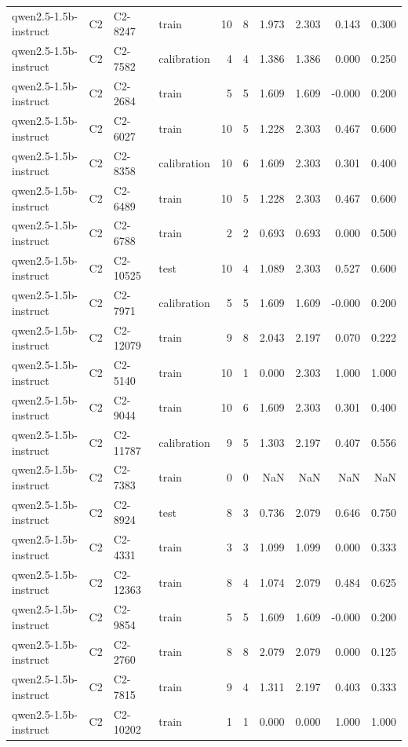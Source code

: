 \begin{table}
\begin{tabular}{llllrrrrrr}
qwen2.5-1.5b-instruct & C2 & C2-8247 & train & 10 & 8 & 1.973 & 2.303 & 0.143 & 0.300 \\
qwen2.5-1.5b-instruct & C2 & C2-7582 & calibration & 4 & 4 & 1.386 & 1.386 & 0.000 & 0.250 \\
qwen2.5-1.5b-instruct & C2 & C2-2684 & train & 5 & 5 & 1.609 & 1.609 & -0.000 & 0.200 \\
qwen2.5-1.5b-instruct & C2 & C2-6027 & train & 10 & 5 & 1.228 & 2.303 & 0.467 & 0.600 \\
qwen2.5-1.5b-instruct & C2 & C2-8358 & calibration & 10 & 6 & 1.609 & 2.303 & 0.301 & 0.400 \\
qwen2.5-1.5b-instruct & C2 & C2-6489 & train & 10 & 5 & 1.228 & 2.303 & 0.467 & 0.600 \\
qwen2.5-1.5b-instruct & C2 & C2-6788 & train & 2 & 2 & 0.693 & 0.693 & 0.000 & 0.500 \\
qwen2.5-1.5b-instruct & C2 & C2-10525 & test & 10 & 4 & 1.089 & 2.303 & 0.527 & 0.600 \\
qwen2.5-1.5b-instruct & C2 & C2-7971 & calibration & 5 & 5 & 1.609 & 1.609 & -0.000 & 0.200 \\
qwen2.5-1.5b-instruct & C2 & C2-12079 & train & 9 & 8 & 2.043 & 2.197 & 0.070 & 0.222 \\
qwen2.5-1.5b-instruct & C2 & C2-5140 & train & 10 & 1 & 0.000 & 2.303 & 1.000 & 1.000 \\
qwen2.5-1.5b-instruct & C2 & C2-9044 & train & 10 & 6 & 1.609 & 2.303 & 0.301 & 0.400 \\
qwen2.5-1.5b-instruct & C2 & C2-11787 & calibration & 9 & 5 & 1.303 & 2.197 & 0.407 & 0.556 \\
qwen2.5-1.5b-instruct & C2 & C2-7383 & train & 0 & 0 & NaN & NaN & NaN & NaN \\
qwen2.5-1.5b-instruct & C2 & C2-8924 & test & 8 & 3 & 0.736 & 2.079 & 0.646 & 0.750 \\
qwen2.5-1.5b-instruct & C2 & C2-4331 & train & 3 & 3 & 1.099 & 1.099 & 0.000 & 0.333 \\
qwen2.5-1.5b-instruct & C2 & C2-12363 & train & 8 & 4 & 1.074 & 2.079 & 0.484 & 0.625 \\
qwen2.5-1.5b-instruct & C2 & C2-9854 & train & 5 & 5 & 1.609 & 1.609 & -0.000 & 0.200 \\
qwen2.5-1.5b-instruct & C2 & C2-2760 & train & 8 & 8 & 2.079 & 2.079 & 0.000 & 0.125 \\
qwen2.5-1.5b-instruct & C2 & C2-7815 & train & 9 & 4 & 1.311 & 2.197 & 0.403 & 0.333 \\
qwen2.5-1.5b-instruct & C2 & C2-10202 & train & 1 & 1 & 0.000 & 0.000 & 1.000 & 1.000 \\

\end{tabular}
\end{table}
